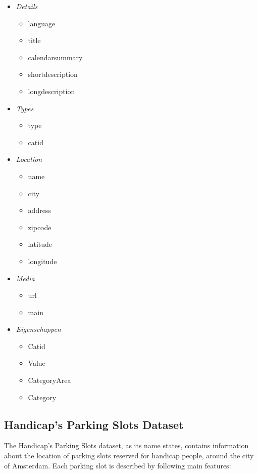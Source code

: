 \documentclass[runningheads,a4paper]{../../StyleFiles/llncs}
\begin{document}
\renewcommand{\labelitemi}{$\bullet$}
\renewcommand{\labelitemii}{$\cdot$}
\renewcommand{\labelitemiii}{$\diamond$}
\renewcommand{\labelitemiv}{$\ast$}
\begin{multicols}{2}
	\begin{itemize}
		\item \textit{Details}\itemsep2pt
		\begin{itemize}\itemsep1pt
			\item language
			\item title
			\item calendarsummary
			\item shortdescription
			\item longdescription
		\end{itemize}
		\item \textit{Types}
		\begin{itemize}\itemsep1pt
			\item type
			\item catid
		\end{itemize}
		\item \textit{Location}
		\begin{itemize}
			\item name
			\item city
			\item address
			\item zipcode
			\item latitude
			\item longitude
		\end{itemize}
		\item \textit{Media}
		\begin{itemize}
			\item url
			\item main
		\end{itemize}
		\item \textit{Eigenschappen}
		\begin{itemize}
			\item Catid
			\item Value
			\item CategoryArea
			\item Category
		\end{itemize}
	\end{itemize}
\end{multicols}

\subsection{Handicap's Parking Slots Dataset}
The Handicap's Parking Slots dataset, as its name states, contains information about the location of parking slots reserved for handicap people, around the city of Amsterdam. Each parking slot is described by following main features:
\end{document}
